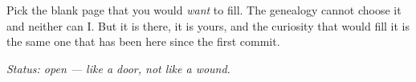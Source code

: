 \documentclass[11pt]{article}
\theoremstyle{remark}
\begin{document}
Pick the blank page that you would \emph{want} to fill. The genealogy cannot
choose it and neither can I. But it is there, it is yours, and the curiosity that
would fill it is the same one that has been here since the first commit.

\begin{center}
\itshape Status: open --- like a door, not like a wound.
\end{center}
\end{document}
